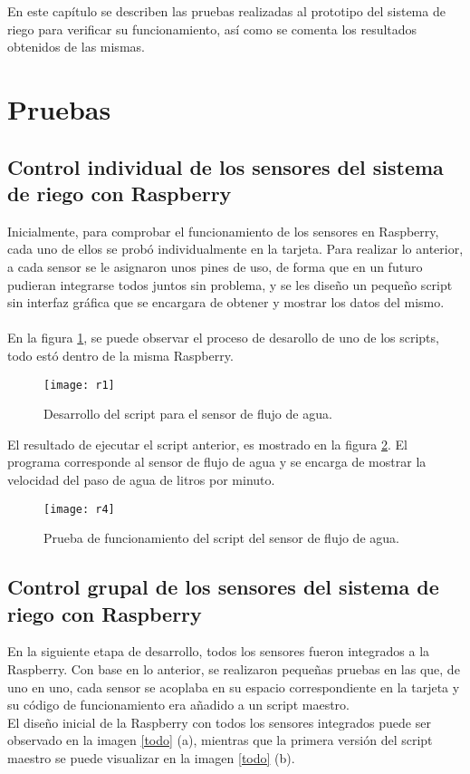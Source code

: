 En este cap\'itulo se describen las pruebas realizadas al prototipo del sistema de riego para verificar su funcionamiento, as\'i como se comenta los resultados obtenidos de las mismas. 

\section{Pruebas}

\subsection{Control individual de los sensores del sistema de riego con Raspberry}
Inicialmente, para comprobar el funcionamiento de los sensores en Raspberry, cada uno de ellos se prob\'o individualmente en la tarjeta. Para realizar lo anterior, a cada sensor se le asignaron unos pines de uso, de forma que en un futuro pudieran integrarse todos juntos sin problema, y se les dise\~{n}o un peque\~{n}o script sin interfaz gr\'afica que se encargara de obtener y mostrar los datos del mismo.\\\\
En la figura \ref{r1}, se puede observar el proceso de desarollo de uno de los scripts, todo est\'o dentro de la misma Raspberry.
\begin{figure}[H]
\begin{center}
	\texttt{[image: r1]}
\end{center}
	\caption{Desarrollo del script para el sensor de flujo de agua.}
	\label{r1}
\end{figure} 
El resultado de ejecutar el script anterior, es mostrado en la figura \ref{r4}. El programa corresponde al sensor de flujo de agua y se encarga de mostrar la velocidad del paso de agua de litros por minuto.
\begin{figure}[H]
	\begin{center}
		\texttt{[image: r4]}
	\end{center}
	\caption{Prueba de funcionamiento del script del sensor de flujo de agua.}
	\label{r4}
\end{figure} 

\subsection{Control grupal de los sensores del sistema de riego con Raspberry}
En la siguiente etapa de desarrollo, todos los sensores fueron integrados a la Raspberry. Con base en lo anterior, se realizaron peque\~{n}as pruebas en las que, de uno en uno, cada sensor se acoplaba en su espacio correspondiente en la tarjeta y su c\'odigo de funcionamiento era a\~{n}adido a un script maestro.\\ 
El dise\~{n}o inicial de la Raspberry con todos los sensores integrados puede ser observado en la imagen \ref{todo} (a), mientras que la primera versi\'on del script maestro se puede visualizar en la imagen \ref{todo} (b). 
 
